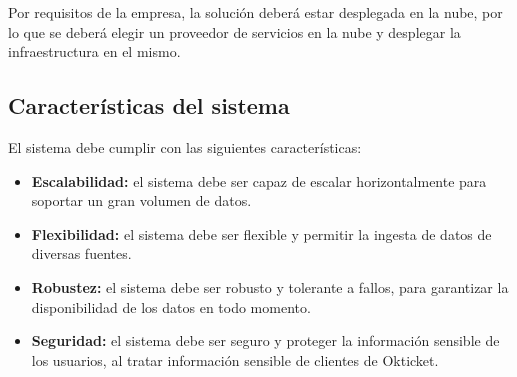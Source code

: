 Por requisitos de la empresa, la solución deberá estar desplegada en la nube,
por lo que se deberá elegir un proveedor de servicios en la nube y desplegar la
infraestructura en el mismo.


\newpage{}
\subsection{Características del sistema}
El sistema debe cumplir con las siguientes características:

\begin{itemize}
	\item \textbf{Escalabilidad:} el sistema debe ser capaz de escalar
		horizontalmente para soportar un gran volumen de datos.
	\item \textbf{Flexibilidad:} el sistema debe ser flexible y permitir la
		ingesta de datos de diversas fuentes.
	\item \textbf{Robustez:} el sistema debe ser robusto y tolerante a fallos,
		para garantizar la disponibilidad de los datos en todo momento.
	\item \textbf{Seguridad:} el sistema debe ser seguro y proteger la
		información sensible de los usuarios, al tratar información sensible de
		clientes de Okticket.
\end{itemize}
